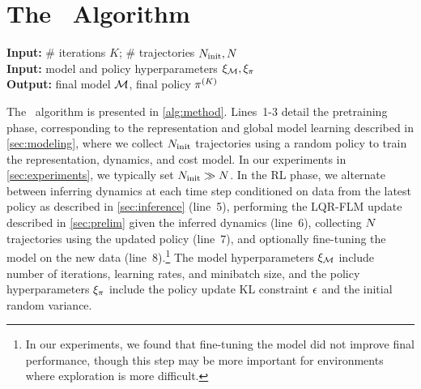 \section{The \metabbr\ Algorithm}
\label{sec:method}

\begin{algorithm}[t]
\hspace*{\algorithmicindent}\textbf{Input:} \# iterations $K$; \# trajectories $N_{\text{init}},N$\\
\hspace*{\algorithmicindent}\textbf{Input:} model and policy hyperparameters $\xi_{\mathcal{M}}, \xi_\pi$\\
\hspace*{\algorithmicindent}\textbf{Output:} final model $\mathcal{M}$, final policy $\pi^{(K)}$\\
\vspace{-.5em}
\begin{algorithmic}[1]
    \vspace{-1em}
\ENDFOR
\end{algorithmic}
\caption{\metabbr}
\label{alg:method}
\end{algorithm}

The \metabbr\ algorithm is presented in \autoref{alg:method}. Lines~\mbox{1-3} detail the pretraining phase, corresponding to the representation and global model learning described in \autoref{sec:modeling}, where we collect $N_{\text{init}}$ trajectories using a random policy to train the representation, dynamics, and cost model. In our experiments in \autoref{sec:experiments}, we typically set $N_{\text{init}}\gg N$. In the RL phase, we alternate between inferring dynamics at each time step conditioned on data from the latest policy as described in \autoref{sec:inference} (line~5), performing the LQR-FLM update described in \autoref{sec:prelim} given the inferred dynamics (line~6), collecting $N$ trajectories using the updated policy (line~7), and optionally fine-tuning the model on the new data (line~8).\footnote{In our experiments, we found that fine-tuning the model did not improve final performance, though this step may be more important for environments where exploration is more difficult.} The model hyperparameters $\xi_{\mathcal{M}}$ include number of iterations, learning rates, and minibatch size, and the policy hyperparameters $\xi_\pi$ include the policy update KL constraint $\epsilon$ and the initial random variance.

